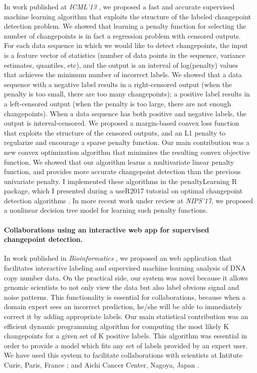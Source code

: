 \documentclass{article}
\begin{document}
In work published at \emph{ICML'13} \citep{HOCKING-penalties}, we
proposed a fast and accurate supervised machine learning algorithm
that exploits the structure of the labeled changepoint detection
problem. We showed that learning a penalty function for selecting the
number of changepoints is in fact a regression problem with censored
outputs. For each data sequence in which we would like to detect
changepoints, the input is a feature vector of statistics (number of
data points in the sequence, variance estimates, quantiles, etc), and
the output is an interval of log(penalty) values that achieves the
minimum number of incorrect labels. We showed that a data sequence
with a negative label results in a right-censored output (when the
penalty is too small, there are too many changepoints); a positive
label results in a left-censored output (when the penalty is too
large, there are not enough changepoints). When a data sequence has
both positive and negative labels, the output is interval-censored.
We proposed a margin-based convex loss function that exploits the
structure of the censored outputs, and an L1 penalty to regularize and
encourage a sparse penalty function. Our main contribution was a new
convex optimization algorithm that minimizes the resulting convex
objective function. We showed that our algorithm learns a multivariate
linear penalty function, and provides more accurate changepoint
detection than the previous univariate penalty. I implemented these
algorithms in the penaltyLearning R package, which I presented during
a useR2017 tutorial on optimal changepoint detection algorithms
\citep{change-tutorial}. In more recent work under review at
\emph{NIPS'17}, we proposed a nonlinear decision tree model for
learning such penalty functions. 

\paragraph{Collaborations using an interactive web app for supervised
  changepoint detection.} In work published in \emph{Bioinformatics}
\citep{hocking-SegAnnDB}, we proposed an web application that
facilitates interactive labeling and supervised machine learning
analysis of DNA copy number data. On the practical side, our system
was novel because it allows genomic scientists to not only view the
data but also label obvious signal and noise patterns. This
functionality is essential for collaborations, because when a domain
expert sees an incorrect prediction, he/she will be able to
immediately correct it by adding appropriate labels. Our main
statistical contribution was an efficient dynamic programming
algorithm for computing the most likely K changepoints for a given set
of K positive labels. This algorithm was essential in order to provide a model
which fits any set of labels provided by an expert user. We have used
this system to facilitate collaborations with scientists at Intitute
Curie, Paris, France \citep{Chicard}; and Aichi Cancer Center, Nagoya,
Japan \citep{Hocking-Leukemia-2016,m14:clonal}.
\end{document}
